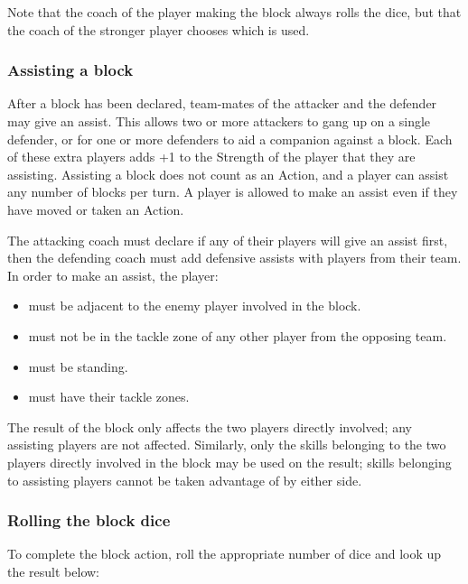\begin{multicols}{2}
\par Note that the coach of the player making the block always rolls the dice, but that the coach of the stronger player chooses which is used.

\subsubsection{Assisting a block}
\par After a block has been declared, team-mates of the attacker and the defender may give an assist. This allows two or more attackers to gang up on a single defender, or for one or more defenders to aid a companion against a block. Each of these extra players adds +1 to the Strength of the player that they are assisting. Assisting a block does not count as an Action, and a player can assist any number of blocks per turn. A player is allowed to make an assist even if they have moved or taken an Action.
\par The attacking coach must declare if any of their players will give an assist first, then the defending coach must add defensive assists with players from their team. In order to make an assist, the player:

\begin{itemize}
\item must be adjacent to the enemy player involved in the block.
\item must not be in the tackle zone of any other player from the opposing team.
\item must be standing.
\item must have their tackle zones.
\end{itemize}

\par The result of the block only affects the two players directly involved; any assisting players are not affected. Similarly, only the skills belonging to the two players directly involved in the block may be used on the result; skills belonging to assisting players cannot be taken advantage of by either side.

\subsubsection{Rolling the block dice}
\par To complete the block action, roll the appropriate number of dice and look up the result below:

\medskip


\end{multicols}
